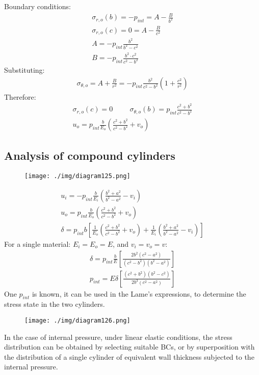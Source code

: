 Boundary conditions:
\begin{gather}
    \sigma_{r,o}(b) = -p_{int} = A - \frac{B}{b^2}\\
    \sigma_{r,o}(c) = 0 = A - \frac{B}{c^2}\\
    A = -p_{int} \frac{b^2}{b^2- c^2}\\
    B = -p_{int} \frac{b^2 \cdot c^2}{c^2 - b^2}
\end{gather}
Substituting:
\begin{gather}
    \sigma_{\theta,o} = A + \frac{B}{r^2} = -p_{int} \frac{b^2}{c^2 - b^2} \left(1+ \frac{c^2}{r^2}\right)
\end{gather}
Therefore:
\begin{gather}
    \sigma_{r,o}(c) = 0 \hspace{1cm} \sigma_{\theta,o}(b) = p_{int}\frac{c^2 + b^2}{c^2 -b^2}\\
    u_o = p_{int} \frac{b}{E_o}\left(\frac{c^2 + b^2}{c^2 - b^2} + v_o\right)
\end{gather}
\subsection{Analysis of compound cylinders}
\begin{figure}[H]
    \centering
    \texttt{[image: ./img/diagram125.png]}
    \caption{}
\end{figure}
\begin{gather}
    u_i =-p_{int}\frac{b}{E_i}\left(\frac{b^2 + a^2 }{b^2 - a^2}-v_i\right)\\
    u_o = p_{int}\frac{b}{E_o}\left(\frac{c^2 + b^2 }{c^2 - b^2}+v_o\right)\\
    \delta = p_{int}b\left[\frac{1}{E_o}\left(\frac{c^2 + b^2}{c^2 - b^2}+v_o\right) + \frac{1}{E_i}\left(\frac{b^2 + a^2}{b^2 - a^2}-v_i\right)\right]
\end{gather}
For a single material: $E_i = E_o = E$, and $v_i = v_o = v$:
\begin{gather}
    \delta = p_{int} \frac{b}{E}\left[\frac{2b^2\left(c^2-a^2\right)}{\left(c^2 - b^2\right)\left(b^2-a^2\right)}\right]\\
    p_{int} = E \delta \left[\frac{\left(c^2 + b^2\right)\left(b^2 - c^2\right)}{2b^3\left(c^2 - a^2\right)}\right]
\end{gather}
One $p_{int}$ is known, it can be used in the Lame's expressions, to determine the stress state in the two cylinders.
\begin{figure}[H]
    \centering
    \texttt{[image: ./img/diagram126.png]}
    \caption{}
\end{figure}
In the case of internal pressure, under linear elastic conditions, the stress distribution can be obtained by selecting suitable BCs, or by superposition with the distribution of a single cylinder of equivalent wall thickness subjected to the internal pressure.
